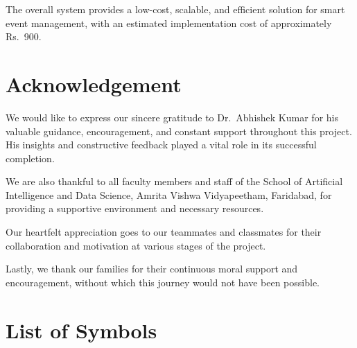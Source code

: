 \documentclass[12pt,a4paper]{report}
\begin{document}
The overall system provides a low-cost, scalable, and efficient solution for smart event management, with an estimated implementation cost of approximately Rs.~900.

\chapter*{Acknowledgement}
\thispagestyle{fancy}

We would like to express our sincere gratitude to Dr.\ Abhishek Kumar for his valuable guidance, encouragement, and constant support throughout this project. His insights and constructive feedback played a vital role in its successful completion.

We are also thankful to all faculty members and staff of the School of Artificial Intelligence and Data Science, Amrita Vishwa Vidyapeetham, Faridabad, for providing a supportive environment and necessary resources.

Our heartfelt appreciation goes to our teammates and classmates for their collaboration and motivation at various stages of the project.

Lastly, we thank our families for their continuous moral support and encouragement, without which this journey would not have been possible.

\newpage

\chapter*{List of Symbols}
\thispagestyle{fancy}
\end{document}
